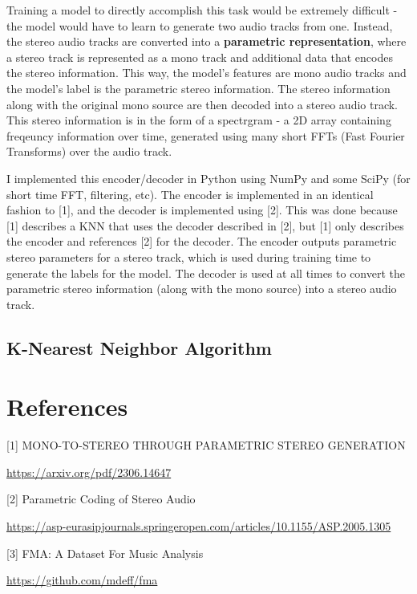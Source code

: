 \documentclass{article}
\begin{document}
Training a model to directly accomplish this task would be extremely difficult - the model would have to learn to generate two audio tracks from one. Instead, the stereo audio tracks are converted into a \textbf{parametric representation}, where a stereo track is represented as a mono track and additional data that encodes the stereo information. This way, the model's features are mono audio tracks and the model's label is the parametric stereo information. The stereo information along with the original mono source are then decoded into a stereo audio track. This stereo information is in the form of a spectrgram - a 2D array containing freqeuncy information over time, generated using many short FFTs (Fast Fourier Transforms) over the audio track.

I implemented this encoder/decoder in Python using NumPy and some SciPy (for short time FFT, filtering, etc). The encoder is implemented in an identical fashion to [1], and the decoder is implemented using [2]. This was done because [1] describes a KNN that uses the decoder described in [2], but [1] only describes the encoder and references [2] for the decoder. The encoder outputs parametric stereo parameters for a stereo track, which is used during training time to generate the labels for the model. The decoder is used at all times to convert the parametric stereo information (along with the mono source) into a stereo audio track.

\subsection{K-Nearest Neighbor Algorithm}


\section*{References}

\small

[1] MONO-TO-STEREO THROUGH PARAMETRIC STEREO GENERATION

\url{https://arxiv.org/pdf/2306.14647}


[2] Parametric Coding of Stereo Audio

\url{https://asp-eurasipjournals.springeropen.com/articles/10.1155/ASP.2005.1305}

[3] FMA: A Dataset For Music Analysis

\url{https://github.com/mdeff/fma}
\end{document}
